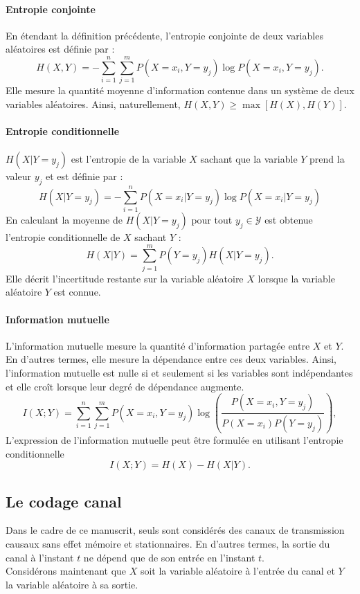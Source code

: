 \paragraph*{Entropie conjointe}
En étendant la définition précédente, l'entropie conjointe de deux variables aléatoires est définie par : 
\[H(X, Y) = - \sum\limits_{i=1}^n\sum\limits_{j=1}^m P(X=x_i, Y=y_j) \log P(X=x_i, Y=y_j).\]
Elle mesure la quantité moyenne d'information contenue dans un système de deux variables aléatoires. 
Ainsi, naturellement, $H(X, Y) \geq \max \left[H(X), H(Y)\right]$.
\paragraph*{Entropie conditionnelle} 
$H(X|Y=y_j)$ est l'entropie de la variable $X$ sachant que la variable $Y$ prend la valeur $y_j$ et est définie par :
\[H(X|Y=y_j) = - \sum \limits_{i=1}^n P(X=x_i|Y=y_j)\log P(X=x_i|Y=y_j)\]
En calculant la moyenne de $H(X|Y=y_j)$ pour tout $y_j\in \mathcal{Y}$ est obtenue l'entropie conditionnelle de $X$ sachant $Y$ : 
\[H(X|Y) = \sum\limits_{j=1}^m P(Y=y_j) H(X|Y=y_j).\] Elle décrit l'incertitude restante sur la variable aléatoire $X$ 
lorsque la variable aléatoire $Y$ est connue.
\paragraph*{Information mutuelle}
L’information mutuelle mesure la quantité d'information partagée entre $X$ et $Y$. En d'autres termes, elle mesure la 
dépendance entre ces deux variables. Ainsi, l'information mutuelle est nulle si et seulement si les variables sont 
indépendantes et elle croît lorsque leur degré de dépendance augmente.
\[I(X;Y) = \sum\limits_{i=1}^n\sum\limits_{j=1}^m P(X=x_i,Y=y_j) \log\left(\frac{P(X=x_i, Y=y_j)}{P(X=x_i)P(Y=y_j)}\right),\]
L'expression de l'information mutuelle peut être formulée en utilisant l'entropie conditionnelle
\begin{equation}
	I(X;Y) = H(X) - H(X|Y).
	\label{eq:imut}
\end{equation}
\subsection{Le codage canal}
Dans le cadre de ce manuscrit, seuls sont considérés des canaux de transmission causaux sans effet mémoire et stationnaires. En d'autres termes, la sortie du canal à l'instant $t$ ne dépend que de son entrée en l'instant $t$.\\
Considérons maintenant que $X$ soit la variable aléatoire à l'entrée du canal et $Y$ la variable aléatoire à sa sortie.
